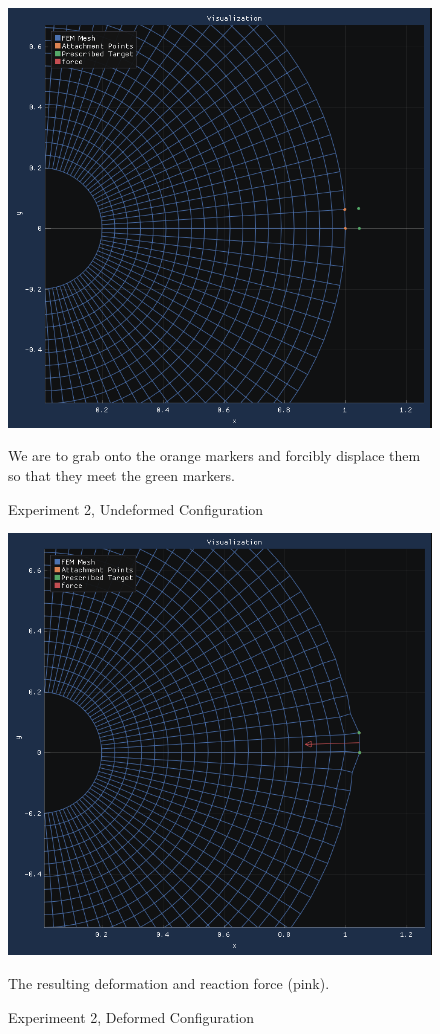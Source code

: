 \documentclass[11pt,letterpaper]{article}
\begin{document}
\begin{figure}[H]
\begin{center}
\includegraphics[width=12cm, keepaspectratio]{before_deformation_radial}
\caption{Experiment 2, Undeformed Configuration}
\label{before-deformation-radial}
We are to grab onto the orange markers and forcibly displace them so that they meet the green markers.
\end{center}
\end{figure}

\begin{figure}[H]
\begin{center}
\includegraphics[width=14cm, keepaspectratio]{after_deformation_radial}
\caption{Experimeent 2, Deformed Configuration}
\label{after-deformation-radial}
The resulting deformation and reaction force (pink).
\end{center}
\end{figure}
\end{document}
